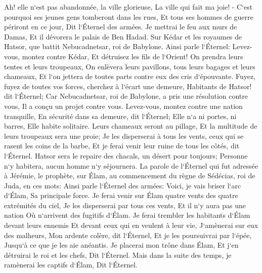 \verse Ah! elle n`est pas abandonnée, la ville glorieuse, La ville qui fait ma joie! - 
\verse C`est pourquoi ses jeunes gens tomberont dans les rues, Et tous ses hommes de guerre périront en ce jour, Dit l`Éternel des armées. 
\verse Je mettrai le feu aux murs de Damas, Et il dévorera le palais de Ben Hadad. 
\verse Sur Kédar et les royaumes de Hatsor, que battit Nebucadnetsar, roi de Babylone. Ainsi parle l`Éternel: Levez-vous, montez contre Kédar, Et détruisez les fils de l`Orient! 
\verse On prendra leurs tentes et leurs troupeaux, On enlèvera leurs pavillons, tous leurs bagages et leurs chameaux, Et l`on jettera de toutes parts contre eux des cris d`épouvante. 
\verse Fuyez, fuyez de toutes vos forces, cherchez à l`écart une demeure, Habitants de Hatsor! dit l`Éternel; Car Nebucadnetsar, roi de Babylone, a pris une résolution contre vous, Il a conçu un projet contre vous. 
\verse Levez-vous, montez contre une nation tranquille, En sécurité dans sa demeure, dit l`Éternel; Elle n`a ni portes, ni barres, Elle habite solitaire. 
\verse Leurs chameaux seront au pillage, Et la multitude de leurs troupeaux sera une proie; Je les disperserai à tous les vents, ceux qui se rasent les coins de la barbe, Et je ferai venir leur ruine de tous les côtés, dit l`Éternel. 
\verse Hatsor sera le repaire des chacals, un désert pour toujours; Personne n`y habitera, aucun homme n`y séjournera. 
\verse La parole de l`Éternel qui fut adressée à Jérémie, le prophète, sur Élam, au commencement du règne de Sédécias, roi de Juda, en ces mots: 
\verse Ainsi parle l`Éternel des armées: Voici, je vais briser l`arc d`Élam, Sa principale force. 
\verse Je ferai venir sur Élam quatre vents des quatre extrémités du ciel, Je les disperserai par tous ces vents, Et il n`y aura pas une nation Où n`arrivent des fugitifs d`Élam. 
\verse Je ferai trembler les habitants d`Élam devant leurs ennemis Et devant ceux qui en veulent à leur vie, J`amènerai sur eux des malheurs, Mon ardente colère, dit l`Éternel, Et je les poursuivrai par l`épée, Jusqu`à ce que je les aie anéantis. 
\verse Je placerai mon trône dans Élam, Et j`en détruirai le roi et les chefs, Dit l`Éternel. 
\verse Mais dans la suite des temps, je ramènerai les captifs d`Élam, Dit l`Éternel. 

